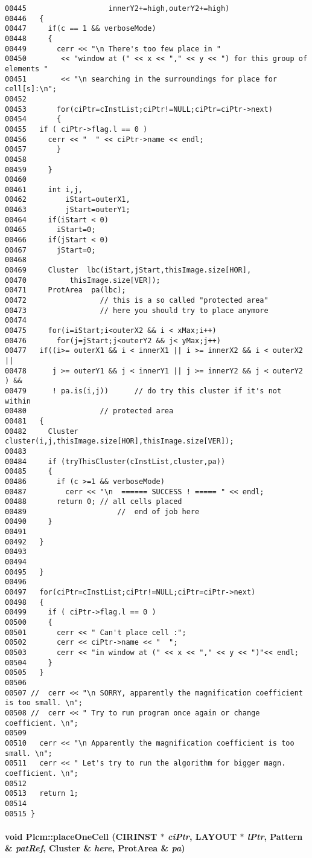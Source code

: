 \begin{verbatim}
00445                   innerY2+=high,outerY2+=high)
00446   {
00447     if(c == 1 && verboseMode)
00448     {
00449       cerr << "\n There's too few place in "
00450        << "window at (" << x << "," << y << ") for this group of elements "
00451        << "\n searching in the surroundings for place for cell[s]:\n";
00452 
00453       for(ciPtr=cInstList;ciPtr!=NULL;ciPtr=ciPtr->next)
00454       {
00455   if ( ciPtr->flag.l == 0 )
00456     cerr << "  " << ciPtr->name << endl;
00457       }
00458 
00459     }
00460 
00461     int i,j,
00462         iStart=outerX1,
00463         jStart=outerY1;
00464     if(iStart < 0)
00465       iStart=0;
00466     if(jStart < 0)
00467       jStart=0;
00468 
00469     Cluster  lbc(iStart,jStart,thisImage.size[HOR],
00470          thisImage.size[VER]);
00471     ProtArea  pa(lbc);
00472                 // this is a so called "protected area"
00473                 // here you should try to place anymore
00474 
00475     for(i=iStart;i<outerX2 && i < xMax;i++)
00476       for(j=jStart;j<outerY2 && j< yMax;j++)
00477   if((i>= outerX1 && i < innerX1 || i >= innerX2 && i < outerX2 ||
00478      j >= outerY1 && j < innerY1 || j >= innerY2 && j < outerY2 ) &&
00479      ! pa.is(i,j))      // do try this cluster if it's not within
00480                 // protected area
00481   {
00482     Cluster cluster(i,j,thisImage.size[HOR],thisImage.size[VER]);
00483 
00484     if (tryThisCluster(cInstList,cluster,pa))
00485     {
00486       if (c >=1 && verboseMode)
00487         cerr << "\n  ====== SUCCESS ! ===== " << endl;
00488       return 0; // all cells placed
00489                     //  end of job here
00490     }
00491 
00492   }
00493 
00494 
00495   }
00496 
00497   for(ciPtr=cInstList;ciPtr!=NULL;ciPtr=ciPtr->next)
00498   {
00499     if ( ciPtr->flag.l == 0 )
00500     {
00501       cerr << " Can't place cell :";
00502       cerr << ciPtr->name << "  ";
00503       cerr << "in window at (" << x << "," << y << ")"<< endl;
00504     }
00505   }
00506 
00507 //  cerr << "\n SORRY, apparently the magnification coefficient is too small. \n";
00508 //  cerr << " Try to run program once again or change coefficient. \n";
00509 
00510   cerr << "\n Apparently the magnification coefficient is too small. \n";
00511   cerr << " Let's try to run the algorithm for bigger magn. coefficient. \n";
00512 
00513   return 1;
00514 
00515 }
\end{verbatim}\normalsize 
\label{Plcm_c12}
\paragraph{\setlength{\rightskip}{0pt plus 5cm}void Plcm::place\-One\-Cell (CIRINST $\ast$ {\em ci\-Ptr}, LAYOUT $\ast$ {\em l\-Ptr}, {\bf Pattern} \& {\em pat\-Ref}, {\bf Cluster} \& {\em here}, {\bf Prot\-Area} \& {\em pa})\hspace{0.3cm}{\tt  [private]}}\hfill



